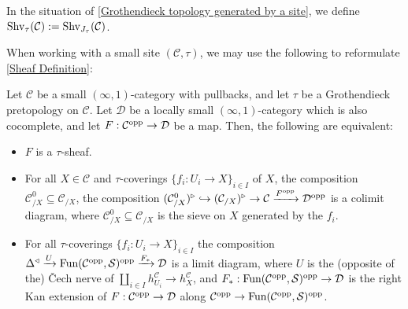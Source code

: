 \documentclass[10pt]{article}
\newcommand{\mS}{\mathcal S}
\newcommand{\C}{\mathcal C}
\newcommand{\cD}{\mathcal{D}}
\theoremstyle{witharg}
\theoremstyle{witharg}
\theoremstyle{witharg2}
\begin{document}
\begin{notation}{}

    In the situation of \ref{Grothendieck topology generated by a site}, we define $\textnormal{Shv}_\tau(\C):=\textnormal{Shv}_{J_\tau}(\C)$. 

\end{notation}






\noindent When working with a small site $(\C,\tau)$, we may use the following to reformulate \ref{Sheaf Definition}:



\begin{lemma}{}\label{Prelim. Cech descent}

    Let $\C$ be a small $(\infty,1)$-category with pullbacks, and let $\tau$ be a Grothendieck pretopology on $\C$. Let $\cD$ be a locally small $(\infty,1)$-category which is also cocomplete, and let $F:\C^{\textnormal{opp}}\rightarrow \cD$ be a map. Then, the following are equivalent: 
    
    \begin{itemize}
    
        \item [$(1)$] $F$ is a $\tau$-sheaf. 


        \item [$(2)$] For all $X\in \C$ and $\tau$-coverings $\{f_i:U_i\rightarrow X\}_{i\in I}$ of $X$, the composition $\C^0_{/X}\subseteq \C_{/X}$, the composition $(\C^0_{/X})^\triangleright\hookrightarrow (\C_{/X})^\triangleright\rightarrow \C\xrightarrow{F^{\textnormal{opp}}}\cD^{\textnormal{opp}}$ is a colimit diagram, where $\C^0_{/X}\subseteq \C_{/X}$ is the sieve on $X$ generated by the $f_i$. 


        \item [$(3)$] For all $\tau$-coverings $\{f_i:U_i\rightarrow X\}_{i\in I}$ the composition $\Delta^\triangleleft\xrightarrow{U}\textnormal{Fun}(\C^{\textnormal{opp}},\mS)^{\textnormal{opp}}\xrightarrow{F_*}\cD$ is a limit diagram, where $U$ is the (opposite of the) \v{C}ech nerve of $\coprod_{i\in I}h^\C_{U_i}\rightarrow h^\C_X$, and $F_*:\textnormal{Fun}(\C^{\textnormal{opp}},\mS)^{\textnormal{opp}}\rightarrow \cD$ is the right Kan extension of $F:\C^{\textnormal{opp}}\rightarrow \cD$ along $\C^{\textnormal{opp}}\rightarrow \textnormal{Fun}(\C^{\textnormal{opp}},\mS)^{\textnormal{opp}}$. 
        
    \end{itemize}

    
\end{lemma}
\end{document}
